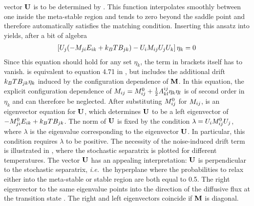 vector $\mathbf{U}$ is to be determined by .
This function interpolates smoothly between one inside the meta-stable region and
tends to zero beyond the saddle point and therefore automatically satisfies the matching condition.
Inserting this ansatz into  yields, after a bit of algebra
\begin{equation}
\label{eq:eigenvectoreq}
\begin{split}
\left[U_j(-M_{ji}E_{ik}  + k_BT B_{jk}) -
U_i M_{ij} U_jU_k\right]\eta_k=0
\end{split}
\end{equation}
Since this equation should hold for any set $\eta_k$, the term in brackets itself has to vanish.
 is equivalent to equation 4.71 in , but includes the 
additional drift $k_BT B_{jk}\eta_k$ induced by the configuration dependence of $\mathbf{M}$. In this equation,
the explicit configuration dependence of $M_{ij}=M_{ij}^{0}+\frac{1}{2}A_{kl}^{ij}\eta_k\eta_l$
is of second order in $\eta_k$ and can therefore be neglected. After substituting $M_{ij}^{0}$
for $M_{ij}$,  is an eigenvector equation 
for $\mathbf{U}$, which determines $\mathbf{U}$ to be a left eigenvector of $-M_{ji}^0E_{ik}  + k_BT B_{jk}$. 
The norm of $\mathbf{U}$ is fixed by the condition $\lambda=U_iM_{ij}^0 U_j$, where $\lambda$ is the
eigenvalue corresponding to the eigenvector $\mathbf{U}$. In particular, this condition requires $\lambda$ 
to be positive. The necessity of the noise-induced drift term is illustrated in , where the stochastic separatrix is 
plotted for different temperatures. The vector $\mathbf{U}$ has an appealing interpretation:
$\mathbf{U}$ is perpendicular to the stochastic separatrix, \emph{i.e.}~the hyperplane where the probabilities
to relax either into the meta-stable or stable region are both equal to 0.5. The right eigenvector to the same eigenvalue
points into the direction of the diffusive flux at the transition state \cite{Berezhkovskii_JChemPhys_05}. The right 
and left eigenvectors coincide if $\mathbf{M}$ is diagonal.
